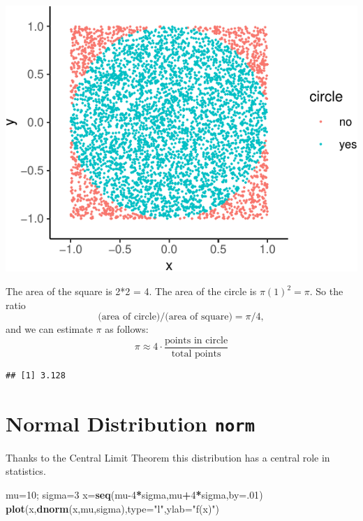 \documentclass[
]{book}
\newenvironment{Shaded}{\begin{snugshade}}{\end{snugshade}}
\newcommand{\AttributeTok}[1]{\textcolor[rgb]{0.13,0.29,0.53}{#1}}
\newcommand{\CommentTok}[1]{\textcolor[rgb]{0.56,0.35,0.01}{\textit{#1}}}
\newcommand{\DecValTok}[1]{\textcolor[rgb]{0.00,0.00,0.81}{#1}}
\newcommand{\FunctionTok}[1]{\textcolor[rgb]{0.13,0.29,0.53}{\textbf{#1}}}
\newcommand{\NormalTok}[1]{#1}
\newcommand{\OtherTok}[1]{\textcolor[rgb]{0.56,0.35,0.01}{#1}}
\newcommand{\SpecialCharTok}[1]{\textcolor[rgb]{0.81,0.36,0.00}{\textbf{#1}}}
\newcommand{\StringTok}[1]{\textcolor[rgb]{0.31,0.60,0.02}{#1}}
\theoremstyle{definition}
\theoremstyle{definition}
\theoremstyle{definition}
\theoremstyle{definition}
\theoremstyle{remark}
\begin{document}
\includegraphics{math340-notes_files/figure-latex/unnamed-chunk-167-1.pdf}

The area of the square is 2*2 = 4.
The area of the circle is \(\pi (1)^2 = \pi.\) So the ratio\\
\[\text{(area of circle)/(area of square)}=\pi/4,\]
and we can estimate \(\pi\) as follows:
\[\pi \approx 4\cdot \frac{\text{points in circle}}{\text{total points}}\]

\begin{Shaded}
\end{Shaded}

\begin{verbatim}
## [1] 3.128
\end{verbatim}

\section{\texorpdfstring{Normal Distribution \texttt{norm}}{Normal Distribution norm}}\label{normalR}

Thanks to the Central Limit Theorem this distribution has a central role in statistics.

\begin{Shaded}
\begin{Highlighting}[]
\NormalTok{mu}\OtherTok{=}\DecValTok{10}\NormalTok{; sigma}\OtherTok{=}\DecValTok{3}
\NormalTok{x}\OtherTok{=}\FunctionTok{seq}\NormalTok{(mu}\DecValTok{{-}4}\SpecialCharTok{*}\NormalTok{sigma,mu}\SpecialCharTok{+}\DecValTok{4}\SpecialCharTok{*}\NormalTok{sigma,}\AttributeTok{by=}\NormalTok{.}\DecValTok{01}\NormalTok{)}
\FunctionTok{plot}\NormalTok{(x,}\FunctionTok{dnorm}\NormalTok{(x,mu,sigma),}\AttributeTok{type=}\StringTok{"l"}\NormalTok{,}\AttributeTok{ylab=}\StringTok{"f(x)"}\NormalTok{)}
\end{Highlighting}
\end{Shaded}
\end{document}
